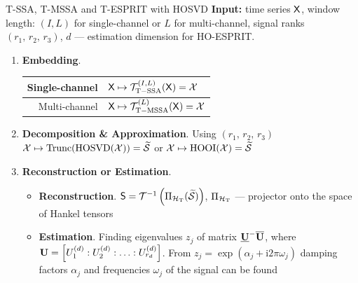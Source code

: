 \documentclass[pdf, unicode, ucs, notheorems]{beamer}
\theoremstyle{definition}
\begin{document}
\begin{frame}{T-SSA, T-MSSA and T-ESPRIT with HOSVD}
  \textbf{Input:} time series $\mathsf{X}$,
  window length: $(I, L)$ for single-channel or $L$ for multi-channel,
  signal ranks $(r_1,\, r_2,\, r_3)$, $d$ --- estimation dimension
  for HO-ESPRIT.
  \vspace{0.4cm}\\
  \begin{enumerate}
    \item \textbf{Embedding}.
      \begin{tabular}{r|l}
        Single-channel & $\mathsf{X} \mapsto\mathcal{T}_{\mathrm{T-SSA}}^{(I,
        L)}(\mathsf{X}) = \mathcal{X}$ \\ \hline
        Multi-channel &
        $\mathsf{X} \mapsto \mathcal{T}_{\mathrm{T-MSSA}}^{(L)}(\mathsf{X}) = \mathcal{X}$
      \end{tabular}
      \vspace{0.2cm}

    \item \textbf{Decomposition \& Approximation}. Using $(r_1,\,
      r_2,\, r_3)$\\\smallskip
      $\mathcal{X} \mapsto
      \operatorname{Trunc}(\operatorname{HOSVD}(\mathcal{X})) =
      \widetilde{\mathcal{S}}$ or
      $\mathcal{X} \mapsto \operatorname{HOOI}(\mathcal{X}) = \widetilde{\mathcal{S}}$
      \vspace{0.2cm}

    \item \textbf{Reconstruction or Estimation}. \\
      \begin{itemize}
        \item \textbf{Reconstruction}.
          $\mathsf{S} = \mathcal{T}^{-1}
          \left(\Pi_{\mathcal{H}_{\mathrm{T}}} (\widetilde{\mathcal{S}})\right)$,
          $\Pi_{\mathcal{H}_{\mathrm{T}}}$ --- projector onto the space of
          Hankel tensors
        \item \textbf{Estimation}. Finding eigenvalues $z_j$ of
          matrix $\underline{\mathbf{U}}^{-}\overline{\mathbf{U}}$, where
          $\mathbf{U} = \left[U_1^{(d)}:U_2^{(d)}:\ldots :U_{r_d}^{(d)}\right]$.
          From $z_j = \exp(\alpha_j + \mathrm{i}2\pi\omega_j)$
          damping factors $\alpha_j$ and frequencies $\omega_j$ of
          the signal can be found
      \end{itemize}
  \end{enumerate}
\end{frame}
\end{document}
